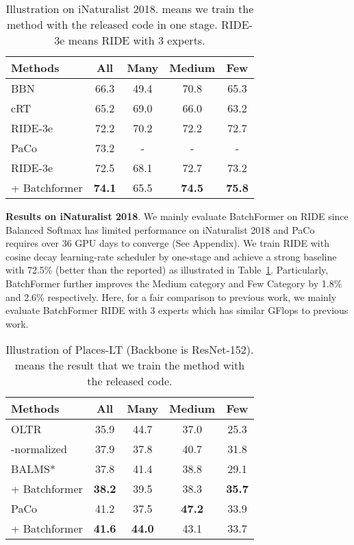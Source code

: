 \documentclass[10pt,twocolumn,letterpaper]{article}
\begin{document}
\begin{table}[tp]
\small
\caption{Illustration on iNaturalist 2018.  means we train the method with the released code in one stage. RIDE-3e means RIDE with 3 experts.}
\label{table:inaturalist}
\centering

\begin{tabular}{@{}lcccc@{}}
\hline
Methods & All & Many & Medium & Few \\
\hline
BBN~\cite{zhou2020bbn} & 66.3 & 49.4 & 70.8 & 65.3 \\
cRT~\cite{kang2019decoupling} & 65.2 & 69.0 & 66.0 & 63.2 \\
RIDE-3e~\cite{wang2020long} & 72.2 & 70.2 & 72.2 & 72.7 \\
PaCo~\cite{cui2021parametric} & 73.2 & - & - & -\\
\hline
RIDE-3e~\cite{wang2020long}  & 72.5 & 68.1 & 72.7 & 73.2 \\
+ Batchformer & {\bf 74.1} & 65.5 & {\bf 74.5} & {\bf 75.8} \\




\hline
\end{tabular}
\end{table}



{\bf  Results on iNaturalist 2018}. We mainly evaluate BatchFormer on RIDE since Balanced Softmax has limited performance on iNaturalist 2018 and PaCo requires over 36 GPU days to converge (See Appendix). We train RIDE with cosine decay learning-rate scheduler by one-stage and achieve a strong baseline with 72.5\% (better than the reported) as illustrated in Table~\ref{table:inaturalist}. Particularly, BatchFormer further improves the Medium category and Few Category by 1.8\% and 2.6\% respectively. Here, for a fair comparison to previous work, we mainly evaluate BatchFormer RIDE with 3 experts which has similar GFlops to previous work.

\begin{table}[tp]
\small
\caption{Illustration of Places-LT (Backbone is ResNet-152).   means the result that we train the method with the released code.}
\label{table:places_lt}
\centering

\begin{tabular}{@{}lcccc@{}}
\hline
Methods & All & Many & Medium & Few \\
\hline


OLTR~\cite{liu2019openlongtailrecognition} & 35.9 & 44.7 & 37.0 & 25.3 \\
-normalized~\cite{kang2019decoupling} & 37.9 & 37.8 & 40.7 & 31.8 \\
\hline
BALMS*~\cite{ren2020balanced} & 37.8 & 41.4 &	   38.8 &	 29.1 \\
+ Batchformer & {\bf 38.2} & 39.5  &   38.3  &  {\bf 35.7} \\
\hline
PaCo~\cite{cui2021parametric} &  41.2 & 37.5 & {\bf 47.2} & 33.9 \\
+ Batchformer &  {\bf 41.6} & {\bf 44.0} & 43.1 & 33.7 \\
\hline
\end{tabular}
\end{table}
\end{document}
